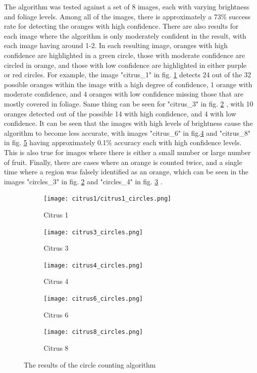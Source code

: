 \documentclass[conference]{IEEEtran}
\begin{document}
The algorithm was tested against a set of 8 images, each with varying brightness and foliage levels. Among all of the images, there is approximately a 73\% success rate for detecting the oranges with high confidence. There are also results for each image where the algorithm is only moderately confident in the result, with each image having around 1-2. In each resulting image, oranges with high confidence are highlighted in a green circle, those with moderate confidence are circled in orange, and those with low confidence are highlighted in either purple or red circles. For example, the image "citrus\_1" in fig. \ref{fig:citrus_results_1} detects 24 out of the 32 possible oranges within the image with a high degree of confidence, 1 orange with moderate confidence, and 4 oranges with low confidence missing those that are mostly covered in foliage. Same thing can be seen for "citrus\_3" in fig. \ref{fig:citrus_results_3} , with 10 oranges detected out of the possible 14 with high confidence, and 4 with low confidence. It can be seen that the images with high levels of brightness cause the algorithm to become less accurate, with images "citrus\_6"  in fig.\ref{fig:citrus_results_6} and "citrus\_8" in fig. \ref{fig:citrus_results_8}  having approximately 0.1\% accuracy each with high confidence levels. This is also true for images where there is either a small number or large number of fruit. Finally, there are cases where an orange is counted twice, and a single time where a region was falsely identified as an orange, which can be seen in the images "circles\_3" in fig. \ref{fig:citrus_results_3} and "circles\_4" in fig. \ref{fig:citrus_results_4} .

\begin{figure}[H]
  \begin{subfigure}{.3\linewidth}
 	 \texttt{[image: citrus1/citrus1\_circles.png]}\hfill
	 \caption{Citrus 1} \label{fig:citrus_results_1}
  \end{subfigure}
   \begin{subfigure}{.3\linewidth}
 	 \texttt{[image: citrus3\_circles.png]}\hfill
	 \caption{Citrus 3}  \label{fig:citrus_results_3}
  \end{subfigure}
   \begin{subfigure}{.3\linewidth}
 	 \texttt{[image: citrus4\_circles.png]}
	 \caption{Citrus 4}  \label{fig:citrus_results_4}
  \end{subfigure}\par\medskip
  
    \begin{subfigure}{.3\linewidth}
 	 \texttt{[image: citrus6\_circles.png]}\hfill
	 \caption{Citrus 6}  \label{fig:citrus_results_6}
  \end{subfigure}
   \begin{subfigure}{.3\linewidth}
 	 \texttt{[image: citrus8\_circles.png]}
	 \caption{Citrus 8}  \label{fig:citrus_results_8}
  \end{subfigure}
  \caption{The results of the circle counting algorithm} \label{fig:citrus_results}
\end{figure}
\end{document}
